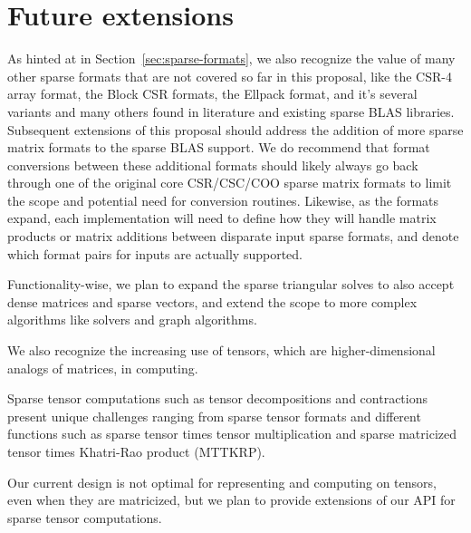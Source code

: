 \documentclass{article}
\begin{document}
\iffalse

The developers of Netlib BLAS have recently become interested in \textit{grading} BLAS implementations according to which error bounds they satisfy.
For example, DGEMM integer matmul accelerator described in \cite{OOY:2023:dgemm_with_integer_matmul} satisfies error bounds that are useful, but different error bounds than conventional floating point.
The basic aspects of a BLAS grading scheme would consider
\begin{itemize}
    \item the kinds of error bounds it satisfies,
    \item the range of numbers it can handle without over/underflow, and
    \item whether it propagates NaNs and Infs as expected
\end{itemize}
-- among other criteria.
Some of these (e.g., weaker error bounds satisfied by Strassen-like algorithms) are not relevant to SparseBLAS, but most are.
\fi

\section{Future extensions}
As hinted at in Section~\ref{sec:sparse-formats}, we also recognize the value of many other sparse formats that are not covered so far in this proposal, like the CSR-4 array format, the Block CSR formats, the Ellpack format, and it's several variants and many others found in literature and existing sparse BLAS libraries.  Subsequent extensions of this proposal should address the addition of more sparse matrix formats to the sparse BLAS support.  We do recommend that format conversions between these additional formats should likely always go back through one of the original core CSR/CSC/COO sparse matrix formats to limit the scope and potential need for conversion routines.  Likewise, as the formats expand, each implementation will need to define how they will handle matrix products or matrix additions between disparate input sparse formats, and denote which format pairs for inputs are actually supported.

Functionality-wise, we plan to expand the sparse triangular solves to also accept dense matrices and sparse vectors, and extend the scope to more complex algorithms like solvers and graph algorithms.

We also recognize the increasing use of tensors, which are higher-dimensional analogs of matrices, in computing. 

Sparse tensor computations such as tensor decompositions and contractions present unique challenges ranging from sparse tensor formats and different functions such as sparse tensor times tensor multiplication and sparse matricized tensor times Khatri-Rao product (MTTKRP).

Our current design is not optimal for representing and computing on tensors, even when they are matricized, but we plan to provide extensions of our API for sparse tensor computations.




%
\end{document}

